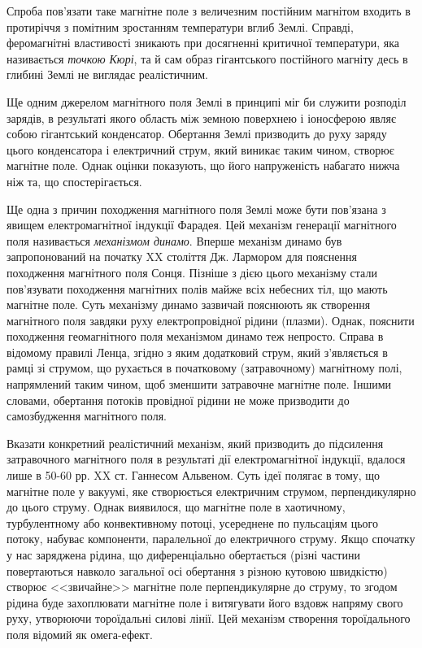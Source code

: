 Спроба пов'язати таке магнітне поле з величезним постійним магнітом входить в протиріччя з помітним зростанням температури вглиб Землі. Справді, феромагнітні властивості зникають при досягненні критичної температури, яка називається \emph{точкою Кюрі}, та й сам образ гігантського постійного магніту десь в глибині Землі не виглядає реалістичним.

Ще одним джерелом магнітного поля Землі в принципі міг би служити розподіл зарядів, в результаті якого область між земною поверхнею і іоносферою являє собою гігантський конденсатор. Обертання Землі призводить до руху заряду цього конденсатора і електричний струм, який виникає таким чином, створює магнітне поле. Однак оцінки показують, що його напруженість набагато нижча ніж та, що спостерігається.

Ще одна з причин походження магнітного поля Землі може бути пов'язана з явищем електромагнітної індукції Фарадея. Цей механізм генерації магнітного поля називається \emph{механізмом динамо}. Вперше механізм динамо був запропонований на початку XX століття  Дж. Лармором для пояснення походження магнітного поля Сонця. Пізніше з дією цього механізму стали пов'язувати походження магнітних полів майже всіх небесних тіл, що мають магнітне поле. Суть механізму динамо зазвичай пояснюють як створення магнітного поля завдяки руху електропровідної рідини (плазми). Однак, пояснити походження геомагнітного поля механізмом динамо теж непросто. Справа в відомому правилі Ленца, згідно з яким додатковий струм, який з'являється в рамці зі струмом, що рухається в початковому (затравочному) магнітному полі, напрямлений таким чином, щоб зменшити затравочне магнітне поле. Іншими словами, обертання потоків провідної рідини не може призводити до самозбудження магнітного поля. 

Вказати конкретний реалістичний механізм, який призводить до підсилення затравочного магнітного поля в результаті дії електромагнітної індукції, вдалося лише в 50-60 рр. XX ст. Ганнесом Альвеном. Суть ідеї полягає в тому, що магнітне поле у вакуумі, яке створюється електричним струмом, перпендикулярно до цього струму. Однак виявилося, що магнітне поле в хаотичному, турбулентному або конвективному потоці, усереднене по пульсаціям цього потоку, набуває компоненти, паралельної до електричного струму. Якщо спочатку у нас заряджена рідина, що диференціально обертається (різні частини повертаються навколо загальної осі обертання з різною кутовою швидкістю) створює <<звичайне>> магнітне поле перпендикулярне до струму, то згодом рідина буде захоплювати магнітне поле і витягувати його вздовж напряму свого руху, утворюючи тороїдальні силові лінії. Цей механізм створення тороїдального поля відомий як омега-ефект.


